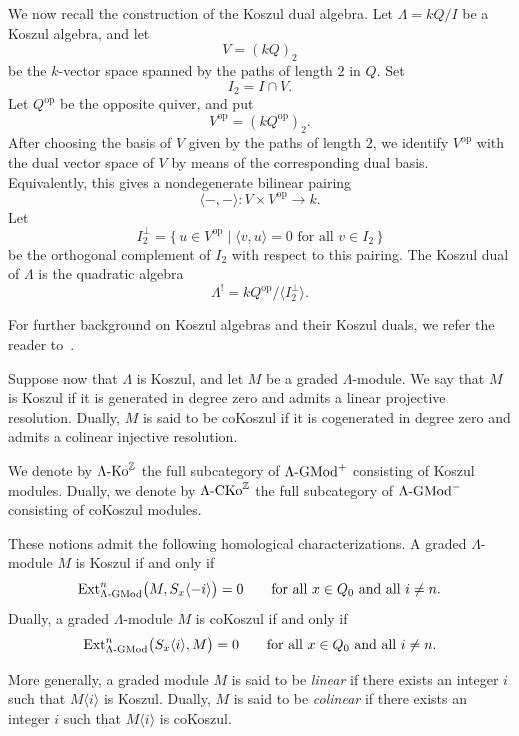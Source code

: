 \documentclass[11pt]{article}
\theoremstyle{definition}
\theoremstyle{remark}
\begin{document}
We now recall the construction of the Koszul dual algebra. Let
\(\Lambda=kQ/I\) be a Koszul algebra, and let
\[
V=(kQ)_2
\]
be the \(k\)-vector space spanned by the paths of length \(2\) in \(Q\). Set
\[
I_2=I\cap V .
\]
Let \(Q^{\mathrm{op}}\) be the opposite quiver, and put
\[
V^{\mathrm{op}}=(kQ^{\mathrm{op}})_2 .
\]
After choosing the basis of \(V\) given by the paths of length \(2\), we identify
\(V^{\mathrm{op}}\) with the dual vector space of \(V\) by means of the
corresponding dual basis. Equivalently, this gives a nondegenerate bilinear
pairing
\[
\langle -,- \rangle \colon V\times V^{\mathrm{op}}\longrightarrow k .
\]
Let
\[
I_2^{\perp}
=
\{\,u\in V^{\mathrm{op}}\mid \langle v,u\rangle=0
\text{ for all }v\in I_2\,\}
\]
be the orthogonal complement of \(I_2\) with respect to this pairing. The
Koszul dual of \(\Lambda\) is the quadratic algebra
\[
\Lambda^{!}
=
kQ^{\mathrm{op}}\big/\langle I_2^{\perp}\rangle .
\]

For further background on Koszul algebras and their Koszul duals, we refer the
reader to~\cite{5}.

\medskip 

Suppose now that \(\Lambda\) is Koszul, and let \(M\) be a graded
\(\Lambda\)-module. We say that \(M\) is Koszul if it is generated in degree zero
and admits a linear projective resolution. Dually, \(M\) is said to be coKoszul
if it is cogenerated in degree zero and admits a colinear injective
resolution.

We denote by
\( 
\Lambda\textup{-Ko}^{\mathbb{Z}}
\)
the full subcategory of \(\Lambda\textup{-GMod}^{+}\) consisting of Koszul
modules. Dually, we denote by
\( 
\Lambda\textup{-CKo}^{\mathbb{Z}}
\)
the full subcategory of \(\Lambda\textup{-GMod}^{-}\) consisting of coKoszul
modules.

These notions admit the following homological characterizations. A graded
\(\Lambda\)-module \(M\) is Koszul if and only if
\[
\operatorname{Ext}^{n}_{\Lambda\textup{-GMod}}
\bigl(M,S_x\langle -i\rangle\bigr)=0
\qquad
\text{for all }x\in Q_0\text{ and all }i\neq n .
\]
Dually, a graded \(\Lambda\)-module \(M\) is coKoszul if and only if
\[
\operatorname{Ext}^{n}_{\Lambda\textup{-GMod}}
\bigl(S_x\langle i\rangle,M\bigr)=0
\qquad
\text{for all }x\in Q_0\text{ and all }i\neq n .
\]

More generally, a graded module \(M\) is said to be \emph{linear} if there exists
an integer \(i\) such that \(M\langle i\rangle\) is Koszul. Dually, \(M\) is
said to be \emph{colinear} if there exists an integer \(i\) such that
\(M\langle i\rangle\) is coKoszul.
\end{document}

